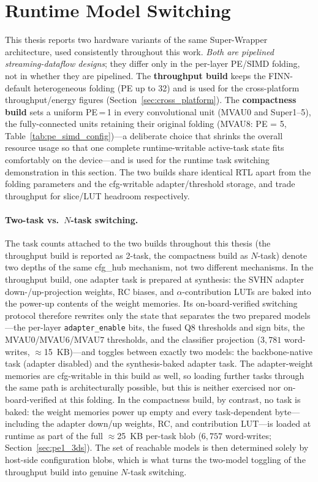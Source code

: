 \documentclass[12pt, a4paper]{report}
\numberwithin{equation}{chapter}
\numberwithin{figure}{chapter}
\numberwithin{table}{chapter}
\numberwithin{algorithm}{chapter}
\begin{document}
\section{Runtime Model Switching}
\label{sec:runtime_switch}

This thesis reports two hardware variants of the same Super-Wrapper architecture, used consistently throughout this work. \emph{Both are pipelined streaming-dataflow designs}; they differ only in the per-layer PE/SIMD folding, not in whether they are pipelined. The \textbf{throughput build} keeps the FINN-default heterogeneous folding (PE up to 32) and is used for the cross-platform throughput/energy figures (Section~\ref{sec:cross_platform}). The \textbf{compactness build} sets a uniform PE\,=\,1 in every convolutional unit (MVAU0 and Super1--5), the fully-connected units retaining their original folding (MVAU8: PE = 5, Table~\ref{tab:pe_simd_config})---a deliberate choice that shrinks the overall resource usage so that one complete runtime-writable active-task state fits comfortably on the device---and is used for the runtime task switching demonstration in this section. The two builds share identical RTL apart from the folding parameters and the cfg-writable adapter/threshold storage, and trade throughput for slice/LUT headroom respectively.

\paragraph{Two-task vs.\ \texorpdfstring{$N$}{N}-task switching.}
The task counts attached to the two builds throughout this thesis (the throughput build is reported as 2-task, the compactness build as $N$-task) denote two depths of the same cfg\_hub mechanism, not two different mechanisms. In the throughput build, one adapter task is prepared at synthesis: the SVHN adapter down-/up-projection weights, RC biases, and $\alpha$-contribution LUTs are baked into the power-up contents of the weight memories. Its on-board-verified switching protocol therefore rewrites only the state that separates the two prepared models---the per-layer \texttt{adapter\_enable} bits, the fused Q8 thresholds and sign bits, the MVAU0/MVAU6/MVAU7 thresholds, and the classifier projection ($3{,}781$ word-writes, $\approx$15~KB)---and toggles between exactly two models: the backbone-native task (adapter disabled) and the synthesis-baked adapter task. The adapter-weight memories are cfg-writable in this build as well, so loading further tasks through the same path is architecturally possible, but this is neither exercised nor on-board-verified at this folding. In the compactness build, by contrast, no task is baked: the weight memories power up empty and every task-dependent byte---including the adapter down/up weights, RC, and contribution LUT---is loaded at runtime as part of the full $\approx$25~KB per-task blob ($6{,}757$ word-writes; Section~\ref{sec:pe1_3ds}). The set of reachable models is then determined solely by host-side configuration blobs, which is what turns the two-model toggling of the throughput build into genuine $N$-task switching.
\end{document}
